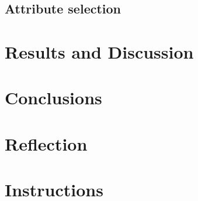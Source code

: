 \documentclass{article}
\begin{document}
\subsection{Attribute selection}
\section{Results and Discussion}
\section{Conclusions}
\section{Reflection}
\section{Instructions}
\end{document}
